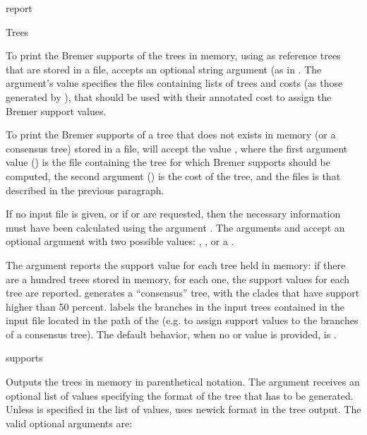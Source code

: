 \begin{command}{report}{}
\begin{arguments}
\begin{argumentgroup}{Trees}
{\setlength{\parindent}{0.5cm}                
\indent 
To print the Bremer supports of the trees in memory, using as reference 
trees that are stored in a file,  accepts an optional 
string argument (as in . The argument's value specifies the files containing lists of
trees and costs (as those generated by ), that
should be used with their annotated cost to assign the Bremer
support values. 

\setlength{\parindent}{0.5cm}                
\indent 
To print the Bremer supports of a tree that does not exists in
memory (or a consensus tree) stored in a file,
 will accept the value
, where the
first argument value (\poystring) is the file containing the tree for which
Bremer supports should be computed, the second argument (\poyint) is the
cost of the tree, and the files is that described in the
previous paragraph.

If no input file is given, or if  or
 are requested, then the necessary
information must have been calculated using the argument 
. The 
arguments  and  
accept an optional argument with two possible values:
, , or a
\poystring.

The argument  reports the support value
for each tree held in memory: if there are a hundred trees stored 
in memory, for each one, the support values for each tree are reported. 
 generates a ``consensus'' tree, with the clades that have
support higher than 50 percent. \poystring labels the branches
in the input trees contained in the input file located in the path of
the \poystring (e.g. to assign support values to the branches of a consensus
tree). The default behavior, when no
 or  value is
provided, is .}
{supports}

{Outputs the trees in memory in parenthetical notation. The argument
 receives an optional list of values
specifying the format of the tree that has to be generated.
Unless  is specified in the list of values, 
 uses newick format in the tree output. The
valid optional arguments are: 

}
\end{argumentgroup}
\end{arguments}
\end{command}
